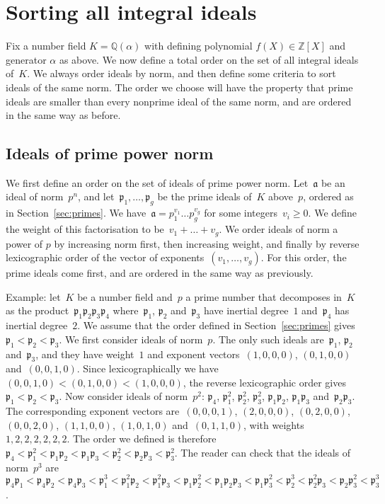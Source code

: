 \documentclass{article}
\def\Z{{\mathbb Z}}
\def\Q{{\mathbb Q}}
\def\a{{\mathfrak a}}
\def\p{{\mathfrak p}}
\begin{document}
\section{Sorting all integral ideals}

Fix a number field $K=\Q(\alpha)$ with defining polynomial
$f(X)\in\Z[X]$ and generator $\alpha$ as above. 
We now define a total order on the set of all integral ideals of~$K$.
We always order ideals by norm, and then define some criteria to sort ideals of
the same norm. The order we choose will have the property that prime ideals are
smaller than every nonprime ideal of the same norm, and are ordered in the same
way as before.

\subsection{Ideals of prime power norm}\label{sec:primepowernorm}

We first define an order on the set of ideals of prime power norm. Let~$\a$ be
an ideal of norm~$p^n$, and let~$\p_1,\dots,\p_g$ be the prime ideals of~$K$
above~$p$, ordered as in Section~\ref{sec:primes}. We have~$\a = p_1^{v_1}\dots
p_g^{v_g}$ for some integers~$v_i\ge 0$. We define the weight of this
factorisation to be~$v_1+\dots+v_g$. We order ideals of norm a power of $p$ by
increasing norm first, then increasing weight, and finally by reverse
lexicographic order of the vector of exponents~$(v_1,\dots,v_g)$. For this
order, the prime ideals come first, and are ordered in the same way as
previously.

Example: let~$K$ be a number field and~$p$ a prime number that decomposes in~$K$
as the product~$\p_1\p_2\p_3\p_4$ where~$\p_1$, $\p_2$ and~$\p_3$ have inertial
degree~$1$ and~$\p_4$ has inertial degree~$2$. We assume that the order defined
in Section~\ref{sec:primes} gives~$\p_1 < \p_2 < \p_3$. We first consider ideals
of norm~$p$. The only such ideals are~$\p_1$, $\p_2$ and~$\p_3$, and they have weight~$1$
and exponent vectors~$(1,0,0,0)$, $(0,1,0,0)$ and~$(0,0,1,0)$. Since
lexicographically we have~$(0,0,1,0)<(0,1,0,0)<(1,0,0,0)$, the reverse
lexicographic order gives~$\p_1<\p_2<\p_3$. Now
consider ideals of norm~$p^2$: $\p_4$, $\p_1^2$, $\p_2^2$, $\p_3^2$, $\p_1\p_2$,
$\p_1\p_3$ and~$\p_2\p_3$. The corresponding exponent vectors are~$(0,0,0,1)$,
$(2,0,0,0)$, $(0,2,0,0)$, $(0,0,2,0)$, $(1,1,0,0)$, $(1,0,1,0)$ and~$(0,1,1,0)$,
with weights~$1,2,2,2,2,2,2$. The order we defined is therefore~$\p_4 < \p_1^2 <
\p_1\p_2 < \p_1\p_3 < \p_2^2 < \p_2\p_3 < \p_3^2$. The reader can check that the
ideals of norm~$p^3$ are~$\p_4\p_1 < \p_4\p_2 < \p_4\p_3 < \p_1^3 < \p_1^2\p_2 <
\p_1^2\p_3 < \p_1\p_2^2 < \p_1\p_2\p_3 < \p_1\p_3^2 < \p_2^3 < \p_2^2\p_3 <
\p_2\p_3^2 < \p_3^3$.
\end{document}
